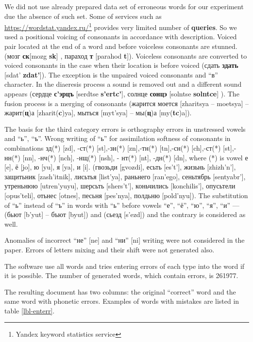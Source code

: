 \documentclass{svproc}
\begin{document}
We did not use already prepared data set of erroneous words for our experiment due the absence of such set. Some of services such as \url{https://wordstat.yandex.ru/}\footnote[1]{Yandex keyword statistics service} provides very limited number of \textbf{queries}.
So we used a positional voicing of consonants in accordance with \cite{Skripnik-2010,Kastkin-1999} description. Voiced pair located at the end of a word and before voiceless consonants are stunned. (мозг {\textbf{ск}}[mozg {\textbf{sk}}] , параход {\textbf{т}} [parahod {\textbf{t}}]). Voiceless consonants are converted to voiced consonants in the case when their location is before voiced (сдать {\textbf{здать}} [sdat’ {\textbf{zdat’}}]). The exception is the unpaired voiced consonants and “в” character. In the diaeresis process a sound is removed out and a different sound appears (сердце {\textbf{с'эрцъ}} [serdtse {\textbf{s’ertc’}}], солнце {\textbf{сонцэ}} [solntse {\textbf{solntce}}] ). The fusion process is a merging of consonants (жарится моется [zharitsya – moetsya] – жарит(\textbf{ц})а [zharit(\textbf{c})ya], мыться [myt’sya] – мы(\textbf{ц})а [my(\textbf{tc})a]).

The basis for the third category errors is orthography errors in unstressed vowels and “ь”, “ъ”.
Wrong writing of “ь” for assimilation softness of consonants in combinations зд(*) [zd], -ст(*) [st],-зн(*) [zn],-тн(*) [tn],-сн(*) [ch],-ст(*) [st],-нн(*) [nn], -нч(*) [nch], -нщ(*) [nsh], - нт(*) [nt], -дн(*) [dn], where (*) is vowel е [e], ё [jo], ю [yu], я [ya], и [i]. (гвозьди [gvozdi], есьть [es’t’], жизьнь [zhizh’n’], защитьник [zash’itnik], лисьтья [list’ya], раньнего [ran’ego], сеньтябрь [sentyabr’], утреньнюю [utren’yuyu],  шерсьть [shers’t’], коньчились [konchilis’], опусьтели [opus’teli], отьнес [otnes], песьня [pes’nya], полдьню [pold’nyu]). The substitution of ``ь'' instead of ``ъ'' in words with ``ь'' before vowels ``е'', ``ё'', ``ю'', ``я'', ``и'' --- (бьют [b’yut] – бъют [byut]) and (сьезд [s’ezd]) and the contrary is considered as well.

Anomalies of incorrect ``не'' [ne] and ``ни'' [ni] writing were not considered in the paper. Errors of letters mixing and their shift were not generated also.

The software use all words and tries entering errors of each type into the word if it is possible. The number of generated words, which contain errors, is 261977.

The resulting document has two columns: the original “correct” word and the same word with phonetic errors. Examples of words with mistakes are listed in table \ref{lbl-enterr}.
\end{document}
